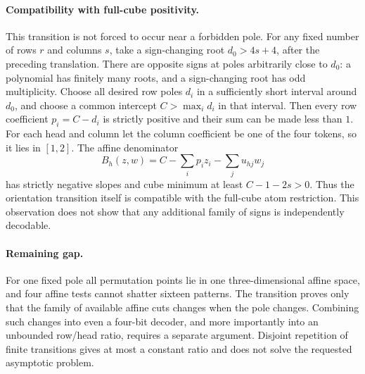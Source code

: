 \documentclass[11pt]{article}
\begin{document}
\paragraph{Compatibility with full-cube positivity.}
This transition is not forced to occur near a forbidden pole.
For any fixed number of rows $r$ and columns $s$, take a sign-changing
root $d_0>4s+4$, after the preceding translation. There are opposite
signs at poles arbitrarily close to $d_0$: a polynomial has finitely
many roots, and a sign-changing root has odd multiplicity. Choose
all desired row poles $d_i$ in a sufficiently short interval around
$d_0$, and choose a common intercept $C>\max_i d_i$ in that interval.
Then every row coefficient $p_i=C-d_i$ is strictly positive and
their sum can be made less than $1$. For each head and column let
the column coefficient be one of the four tokens, so it lies in
$[1,2]$. The affine denominator
\[
 B_h(z,w)=C-\sum_i p_i z_i-\sum_j u_{hj}w_j
\]
has strictly negative slopes and cube minimum at least
$C-1-2s>0$. Thus the orientation transition itself is compatible
with the full-cube atom restriction. This observation does not show
that any additional family of signs is independently decodable.

\paragraph{Remaining gap.}
For one fixed pole all permutation points lie in one three-dimensional
affine space, and four affine tests cannot shatter sixteen patterns.
The transition proves only that the family of available affine cuts
changes when the pole changes. Combining such changes into even a
four-bit decoder, and more importantly into an unbounded row/head
ratio, requires a separate argument. Disjoint repetition of finite
transitions gives at most a constant ratio and does not solve the
requested asymptotic problem.
\end{document}
